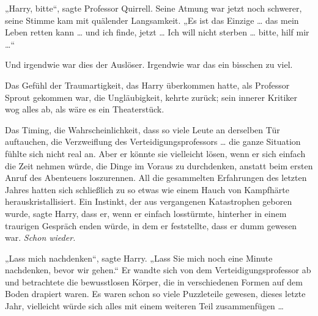 „Harry, bitte“, sagte Professor Quirrell.
Seine Atmung war jetzt noch schwerer, seine Stimme kam mit quälender Langsamkeit.
„Es ist das Einzige … das mein Leben retten kann … und ich finde, jetzt … Ich will nicht sterben … bitte, hilf mir …“

Und irgendwie war dies der Auslöser. Irgendwie war das ein bisschen zu viel.

Das Gefühl der Traumartigkeit, das Harry überkommen hatte, als Professor Sprout gekommen war, die Ungläubigkeit, kehrte zurück; sein innerer Kritiker wog alles ab, als wäre es ein Theaterstück.

Das Timing, die Wahrscheinlichkeit, dass so viele Leute an derselben Tür auftauchen, die Verzweiflung des Verteidigungsprofessors … die ganze Situation fühlte sich nicht real an. Aber er könnte sie vielleicht lösen, wenn er sich einfach die Zeit nehmen würde, die Dinge im Voraus zu durchdenken, anstatt beim ersten Anruf des Abenteuers loszurennen. All die gesammelten Erfahrungen des letzten Jahres hatten sich schließlich zu so etwas wie einem Hauch von Kampfhärte herauskristallisiert. Ein Instinkt, der aus vergangenen Katastrophen geboren wurde, sagte Harry, dass er, wenn er einfach losstürmte, hinterher in einem traurigen Gespräch enden würde, in dem er feststellte, dass er dumm gewesen war. \emph{Schon wieder.}

„Lass mich nachdenken“, sagte Harry.
„Lass Sie mich noch eine Minute nachdenken, bevor wir gehen.“
Er wandte sich von dem Verteidigungsprofessor ab und betrachtete die bewusstlosen Körper, die in verschiedenen Formen auf dem Boden drapiert waren. Es waren schon so viele Puzzleteile gewesen, dieses letzte Jahr, vielleicht würde sich alles mit einem weiteren Teil zusammenfügen …

